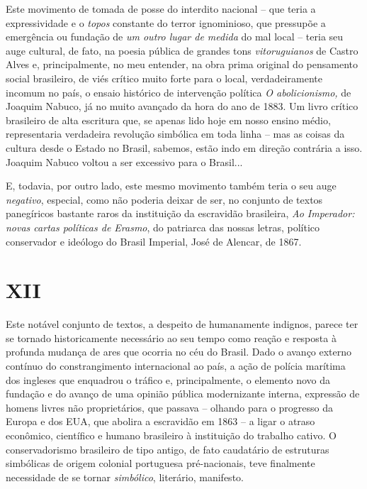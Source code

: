 Este movimento de tomada de posse do interdito nacional -- que teria a
expressividade e o \emph{topos} constante do terror ignominioso, que
pressupõe a emergência ou fundação de \emph{um outro lugar de medida} do
mal local -- teria seu auge cultural, de fato, na poesia pública de
grandes tons \emph{vitoruguianos} de Castro Alves e, principalmente, no
meu entender, na obra prima original do pensamento social brasileiro, de
viés crítico muito forte para o local, verdadeiramente incomum no país,
o ensaio histórico de intervenção política \emph{O abolicionismo,} de
Joaquim Nabuco, já no muito avançado da hora do ano de 1883. Um livro
crítico brasileiro de alta escritura que, se apenas lido hoje em nosso
ensino médio, representaria verdadeira revolução simbólica em toda linha
-- mas as coisas da cultura desde o Estado no Brasil, sabemos, estão
indo em direção contrária a isso. Joaquim Nabuco voltou a ser excessivo
para o Brasil...

E, todavia, por outro lado, este mesmo movimento também teria o seu auge
\emph{negativo}, especial, como não poderia deixar de ser, no conjunto
de textos panegíricos bastante raros da instituição da escravidão
brasileira, \emph{Ao Imperador: novas cartas políticas de Erasmo}, do
patriarca das nossas letras, político conservador e ideólogo do Brasil
Imperial, José de Alencar, de 1867.

\section{XII}

Este notável conjunto de textos, a despeito de humanamente indignos,
parece ter se tornado historicamente necessário ao seu tempo como reação
e resposta à profunda mudança de ares que ocorria no céu do Brasil. Dado
o avanço externo contínuo do constrangimento internacional ao país, a
ação de polícia marítima dos ingleses que enquadrou o tráfico e,
principalmente, o elemento novo da fundação e do avanço de uma opinião
pública modernizante interna, expressão de homens livres não
proprietários, que passava -- olhando para o progresso da Europa e dos
EUA, que abolira a escravidão em 1863 -- a ligar o atraso econômico,
científico e humano brasileiro à instituição do trabalho cativo. O
conservadorismo brasileiro de tipo antigo, de fato caudatário de
estruturas simbólicas de origem colonial portuguesa pré-nacionais, teve
finalmente necessidade de se tornar \emph{simbólico}, literário,
manifesto.

